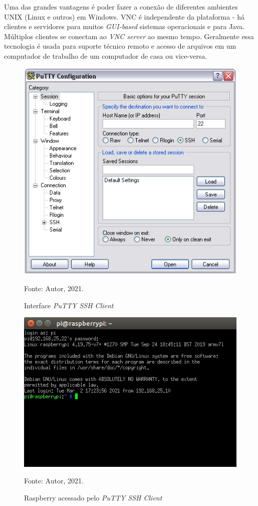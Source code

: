 \documentclass[
12pt,
openany, %
oneside, %
a4paper,			
english,			
brazil			        %
]{abntbibufjf}
\begin{document}
	Uma das grandes vantagens é poder fazer a conexão de diferentes ambientes UNIX (Linux e outros) em Windows. VNC é independente da plataforma - há clientes e servidores para muitos \textit{GUI-based} sistemas operacionais e para Java. Múltiplos clientes se conectam ao \textit{VNC server} ao mesmo tempo. Geralmente essa tecnologia é usada para suporte técnico remoto e acesso de arquivos em um computador de trabalho de um computador de casa ou vice-versa.
	
	\begin{figure}[!htb]
		\centering
		\includegraphics[scale=0.6]{Figuras/putty-portable.png}
		\caption{Interface \textit{PuTTY SSH Client}}
		\label{putty}
		\par Fonte: Autor, 2021.
	\end{figure}
	
	\begin{figure}[!htb]
		\centering
		\includegraphics[scale=0.6]{Figuras/Raspberry-pelo-SSH.png}
		\caption{Raspberry acessado pelo \textit{PuTTY SSH Client}}
		\label{Rasp-putty}
		\par Fonte: Autor, 2021.
	\end{figure}
	
\end{document}
